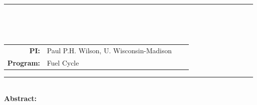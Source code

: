 \documentclass[dvips,12pt]{article}
\begin{document}
\vspace*{0.5in}

\noindent\rule{\textwidth}{1pt}\

\vspace*{0.2in}

\begin{centering}
  \textbf{\large \mytitle}\\
\end{centering}

\vspace*{0.25in}

\noindent
\begin{tabularx}{\textwidth}{rlrl}
   \textbf{PI:} & Paul P.H. Wilson, U. Wisconsin-Madison \\
   \textbf{Program:} & Fuel Cycle
\end{tabularx}



\vspace{0.2in}
\noindent\rule{\textwidth}{1pt}\\

\noindent\textbf{Abstract:} 
\end{document}
